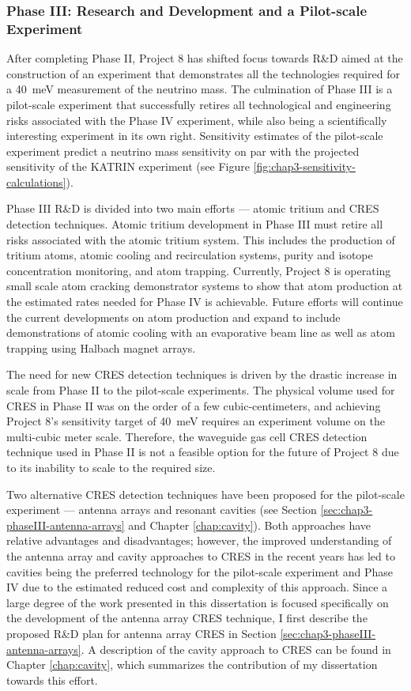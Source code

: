 \subsubsection*{Phase III: Research and Development and a Pilot-scale Experiment}

After completing Phase II, Project 8 has shifted focus towards R\&D aimed at the construction of an experiment that demonstrates all the technologies required for a 40~meV measurement of the neutrino mass. The culmination of Phase III is a pilot-scale experiment that successfully retires all technological and engineering risks associated with the Phase IV experiment, while also being a scientifically interesting experiment in its own right. Sensitivity estimates of the pilot-scale experiment predict a neutrino mass sensitivity on par with the projected sensitivity of the KATRIN experiment (see Figure \ref{fig:chap3-sensitivity-calculations}). 

Phase III R\&D is divided into two main efforts --- atomic tritium and CRES detection techniques. Atomic tritium development in Phase III must retire all risks associated with the atomic tritium system. This includes the production of tritium atoms, atomic cooling and recirculation systems, purity and isotope concentration monitoring, and atom trapping. Currently, Project 8 is operating small scale atom cracking demonstrator systems to show that atom production at the estimated rates needed for Phase IV is achievable. Future efforts will continue the current developments on atom production and expand to include demonstrations of atomic cooling with an evaporative beam line as well as atom trapping using Halbach magnet arrays.

The need for new CRES detection techniques is driven by the drastic increase in scale from Phase II to the pilot-scale experiments. The physical volume used for CRES in Phase II was on the order of a few cubic-centimeters, and achieving Project 8's sensitivity target of 40~meV requires an experiment volume on the multi-cubic meter scale. Therefore, the waveguide gas cell CRES detection technique used in Phase II is not a feasible option for the future of Project 8 due to its inability to scale to the required size.

Two alternative CRES detection techniques have been proposed for the pilot-scale experiment --- antenna arrays and resonant cavities (see Section \ref{sec:chap3-phaseIII-antenna-arrays} and Chapter \ref{chap:cavity}). Both approaches have relative advantages and disadvantages; however, the improved understanding of the antenna array and cavity approaches to CRES in the recent years has led to cavities being the preferred technology for the pilot-scale experiment and Phase IV due to the estimated reduced cost and complexity of this approach. Since a large degree of the work presented in this dissertation is focused specifically on the development of the antenna array CRES technique, I first describe the proposed R\&D plan for antenna array CRES in Section \ref{sec:chap3-phaseIII-antenna-arrays}. A description of the cavity approach to CRES can be found in Chapter \ref{chap:cavity}, which summarizes the contribution of my dissertation towards this effort.


